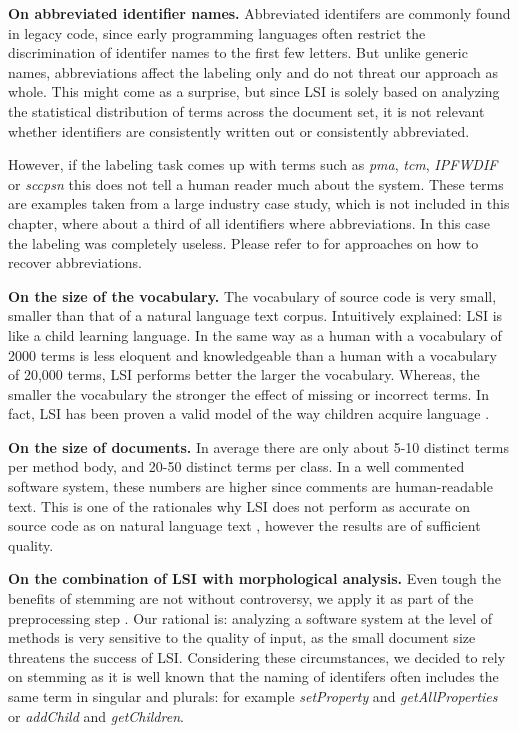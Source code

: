 \textbf{On abbreviated identifier names.} Abbreviated identifers are commonly found in legacy code, since early programming languages often restrict the discrimination of identifer names to the first few letters. But unlike generic names, abbreviations affect the labeling only and do not threat our approach  as whole. This might come as a surprise, but since LSI is solely based on analyzing the statistical distribution of terms across the document set, it is not relevant whether identifiers are consistently written out or consistently abbreviated.

However, if the labeling task comes up with terms such as \emph{pma}, \emph{tcm}, \emph{IPFWDIF} or \emph{sccpsn} this does not tell a human reader much about the system. These terms are examples taken from a large industry case study, which is not included in this chapter, where about a third of all identifiers where abbreviations. In this case the labeling was completely useless. Please refer to \cite{Anqu98b} for approaches on how to recover abbreviations.

\textbf{On the size of the vocabulary.}  The vocabulary of source code is very small, smaller than that of a natural language text corpus. Intuitively explained: LSI is like a child learning language. In the same way as a human with a vocabulary of 2000 terms is less eloquent and knowledgeable than a human with a vocabulary of 20,000 terms, LSI performs better the larger the vocabulary. Whereas, the smaller the vocabulary the stronger the effect of missing or incorrect terms. In fact, LSI has been proven a valid model of the way children acquire language \cite{Land97a}.

\textbf{On the size of documents.} In average there are only about 5-10 distinct terms per method body, and 20-50 distinct terms per class. In a well commented software system, these numbers are higher since comments are human-readable text. This is one of the rationales why LSI does not perform as accurate on source code as on natural language text \cite{Luci04a}, however the results are of sufficient quality.

\textbf{On the combination of LSI with morphological analysis.} Even tough the benefits of stemming are not without controversy, we apply it as part of the preprocessing step \cite{Baez99b}. Our rational is: analyzing a software system at the level of methods is very sensitive to the quality of input, as the small document size threatens the success of LSI. Considering these circumstances, we  decided to rely on stemming as it is well known that the naming of identifers often includes the same term in singular and plurals: for example \emph{setProperty} and \emph{getAllProperties} or \emph{addChild} and \emph{getChildren}.


